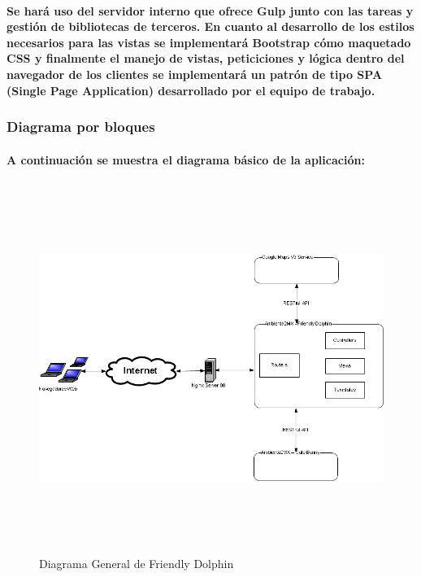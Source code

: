       \paragraph{Se hará uso del servidor interno que ofrece Gulp junto con las tareas y gestión de bibliotecas de terceros. En cuanto al desarrollo de los estilos necesarios para las vistas se implementará Bootstrap cómo maquetado CSS y finalmente el manejo de vistas, peticiciones y lógica dentro del navegador de los clientes se implementará un patrón de tipo SPA (Single Page Application)\cite{36} desarrollado por el equipo de trabajo.}
  \newpage
    \begin{landscape}
    \subsubsection{Diagrama por bloques}
   \paragraph{A continuación se muestra el diagrama básico de la aplicación:}
      \begin{figure}[b!]
      \centering
      \includegraphics[width=22.5cm,height=12cm]{./images/DiagramaFriendlyDolphin.png}
      \caption{Diagrama General de Friendly Dolphin}
    \end{figure}
    \end{landscape}
  \newpage